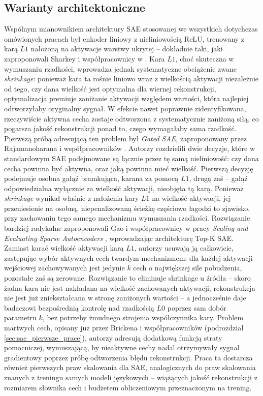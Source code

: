 \subsection{Warianty architektoniczne}
\label{sec:sae_warianty}
Wspólnym mianownikiem architektury SAE stosowanej we wszystkich dotychczas omówionych pracach był enkoder liniowy z nieliniowością ReLU, trenowany z karą $L1$ nałożoną na aktywacje warstwy ukrytej -- dokładnie taki, jaki zaproponowali Sharkey i współpracownicy w \cite{sharkey_2022_taking_features_out_of_superposition}. Kara $L1$, choć skuteczna w wymuszaniu rzadkości, wprowadza jednak systematyczne obciążenie zwane \textit{shrinkage}: ponieważ kara ta rośnie liniowo wraz z wielkością aktywacji niezależnie od tego, czy dana wielkość jest optymalna dla wiernej rekonstrukcji, optymalizacja premiuje zaniżanie aktywacji względem wartości, która najlepiej odtworzyłaby oryginalny sygnał. W efekcie nawet poprawnie zidentyfikowana, rzeczywiście aktywna cecha zostaje odtworzona z systematycznie zaniżoną siłą, co pogarsza jakość rekonstrukcji ponad to, czego wymagałaby sama rzadkość. \newline
Pierwszą próbą adresującą ten problem był \textit{Gated SAE}, zaproponowany przez Rajamanoharana i współpracowników \cite{rajamanoharan_2024a_gated_sparse_autoencoders}. Autorzy rozdzielili dwie decyzje, które w standardowym SAE podejmowane są łącznie przez tę samą nieliniowość: czy dana cecha powinna być aktywna, oraz jaką powinna mieć wielkość. Pierwszą decyzję podejmuje osobna gałąź bramkująca, karana za pomocą $L1$, drugą zaś -- gałąź odpowiedzialna wyłącznie za wielkość aktywacji, nieobjęta tą karą. Ponieważ \textit{shrinkage} wynikał właśnie z nałożenia kary $L1$ na wielkość aktywacji, jej przeniesienie na osobną, niepenalizowaną ścieżkę częściowo łagodzi to zjawisko, przy zachowaniu tego samego mechanizmu wymuszania rzadkości. \newline
Rozwiązanie bardziej radykalne zaproponowali Gao i współpracownicy w pracy \textit{Scaling and Evaluating Sparse Autoencoders} \cite{gao_2024_scaling_evaluating_sparse_autoencoders}, wprowadzając architekturę Top-K SAE. Zamiast karać wielkość aktywacji karą $L1$, autorzy usuwają ją całkowicie, zastępując wybór aktywnych cech twardym mechanizmem: dla każdej aktywacji wejściowej zachowywanych jest jedynie $k$ cech o największej sile pobudzenia, pozostałe zaś są zerowane. Rozwiązanie to eliminuje shrinkage u źródła -- skoro żadna kara nie jest nakładana na wielkość zachowanych aktywacji, rekonstrukcja nie jest już zniekształcana w stronę zaniżonych wartości -- a jednocześnie daje badaczowi bezpośrednią kontrolę nad rzadkością $L0$ poprzez sam dobór parametru $k$, bez potrzeby żmudnego strojenia współczynnika kary. Problem martwych cech, opisany już przez Brickena i współpracowników (podrozdział \ref{sec:sae_pierwsze_prace}), autorzy adresują dodatkową funkcją straty pomocniczej, wymuszającą, by nieaktywne cechy nadal otrzymywały sygnał gradientowy poprzez próbę odtworzenia błędu rekonstrukcji. Praca ta dostarcza również pierwszych praw skalowania dla SAE, analogicznych do praw skalowania znanych z treningu samych modeli językowych -- wiążących jakość rekonstrukcji z rozmiarem słownika cech i budżetem obliczeniowym przeznaczonym na trening. \newline
